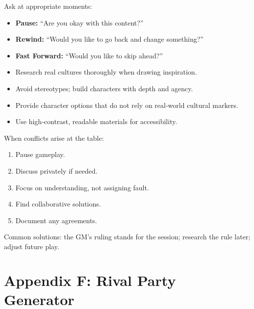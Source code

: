 \begin{tcolorbox}[title=Script Change, colback=white!97!gray, colframe=black!80!gray]
Ask at appropriate moments:
\begin{itemize}
  \item \textbf{Pause:} “Are you okay with this content?”
  \item \textbf{Rewind:} “Would you like to go back and change something?”
  \item \textbf{Fast Forward:} “Would you like to skip ahead?”
\end{itemize}
\end{tcolorbox}

\begin{tcolorbox}[title=Inclusive Worldbuilding, colback=white!97!gray, colframe=black!80!gray]
\begin{itemize}
  \item Research real cultures thoroughly when drawing inspiration.
  \item Avoid stereotypes; build characters with depth and agency.
  \item Provide character options that do not rely on real‑world cultural markers.
  \item Use high‑contrast, readable materials for accessibility.
\end{itemize}
\end{tcolorbox}

\begin{tcolorbox}[title=Conflict Resolution, colback=white!97!gray, colframe=black!80!gray]
When conflicts arise at the table:
\begin{enumerate}
  \item Pause gameplay.
  \item Discuss privately if needed.
  \item Focus on understanding, not assigning fault.
  \item Find collaborative solutions.
  \item Document any agreements.
\end{enumerate}
Common solutions: the GM’s ruling stands for the session; research the rule later; adjust future play.
\end{tcolorbox}

\clearpage
\section*{Appendix F: Rival Party Generator}
\label{app:rival-generator}

